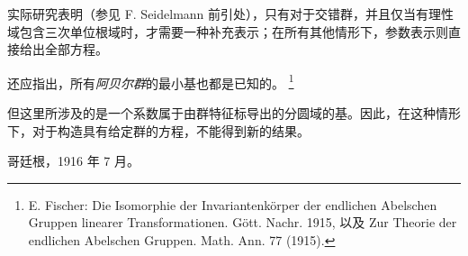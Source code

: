 \documentclass[11pt]{article}
\providecommand{\srcfn}[2]{%
  \begingroup
  \renewcommand{\thefootnote}{#1}%
  \footnote{#2}%
  \addtocounter{footnote}{-1}%
  \endgroup}
\begin{document}
实际研究表明（参见 F. Seidelmann 前引处），只有对于交错群，并且仅当有理性域包含三次单位根域时，才需要一种补充表示；在所有其他情形下，参数表示则直接给出全部方程。

还应指出，所有\emph{阿贝尔群}的最小基也都是已知的。\srcfn{**)}{E. Fischer: Die Isomorphie der Invariantenkörper der endlichen Abelschen Gruppen linearer Transformationen. Gött. Nachr. 1915, 以及 Zur Theorie der endlichen Abelschen Gruppen. Math. Ann. 77 (1915).} 但这里所涉及的是一个系数属于由群特征标导出的分圆域的基。因此，在这种情形下，对于构造具有给定群的方程，不能得到新的结果。

哥廷根，1916 年 7 月。

\clearpage
\setcounter{footnote}{0}
\providecommand{\bdelta}{\bar{\delta}}
\end{document}
